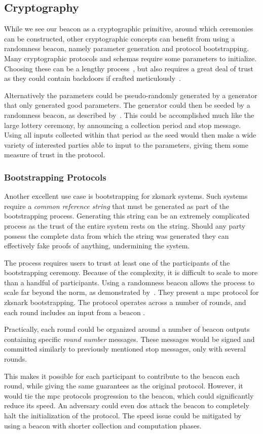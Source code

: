 \subsection{Cryptography}
While we see our beacon as a cryptographic primitive, around which ceremonies can be constructed, other cryptographic concepts can benefit from using a randomness beacon, namely parameter generation and protocol bootstrapping.
Many cryptographic protocols and schemas require some parameters to initialize.
Choosing these can be a lengthy process~\cite{mpcsnarks}, but also requires a great deal of trust as they could contain backdoors if crafted meticulously~\cite{nist2014backdoor}.

Alternatively the parameters could be pseudo-randomly generated by a generator that only generated good parameters.
The generator could then be seeded by a randomness beacon, as described by~\citet{baigneres2015trap}.
This could be accomplished much like the large lottery ceremony, by announcing a collection period and stop message.
Using all inputs collected within that period as the seed would then make a wide variety of interested parties able to input to the parameters, giving them some measure of trust in the protocol.

\subsubsection{Bootstrapping Protocols}%
\label{ssub:bootstrapping_protocols}
Another excellent use case is bootstrapping for \gls{zksnark} systems.
Such systems require a \emph{common reference string} that must be generated as part of the bootstrapping process.
Generating this string can be an extremely complicated process as the trust of the entire system rests on the string.
Should any party possess the complete data from which the string was generated they can effectively fake proofs of anything, undermining the system.

The process requires users to trust at least one of the participants of the bootstrapping ceremony. Because of the complexity, it is difficult to scale to more than a handful of participants.
Using a randomness beacon allows the process to scale far beyond the norm, as demonstrated by~\citet{mpcsnarks}.
They present a \acrshort{mpc} protocol for \acrshort{zksnark} bootstrapping.
The protocol operates across a number of rounds, and each round includes an input from a beacon .

Practically, each round could be organized around a number of beacon outputs containing specific \textit{round number} messages.
These messages would be signed and committed similarly to previously mentioned stop messages, only with several rounds.

This makes it possible for each participant to contribute to the beacon each round, while giving the same guarantees as the original protocol.
However, it would tie the \acrshort{mpc} protocols progression to the beacon, which could significantly reduce its speed.
An adversary could even \acrshort{dos} attack the beacon to completely halt the initialization of the protocol.
The speed issue could be mitigated by using a beacon with shorter collection and computation phases.
